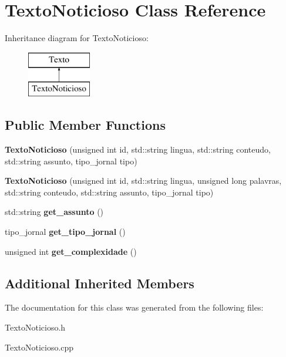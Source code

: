 \hypertarget{class_texto_noticioso}{\section{Texto\-Noticioso Class Reference}
\label{class_texto_noticioso}
}
Inheritance diagram for Texto\-Noticioso\-:\begin{figure}[H]
\begin{center}
\leavevmode
\includegraphics[height=2.000000cm]{class_texto_noticioso}
\end{center}
\end{figure}
\subsection*{Public Member Functions}
\begin{DoxyCompactItemize}
\item 
\hypertarget{class_texto_noticioso_a74a984b14609c5ad38a32cefcc5c9da7}{{\bfseries Texto\-Noticioso} (unsigned int id, std\-::string lingua, std\-::string conteudo, std\-::string assunto, tipo\-\_\-jornal tipo)}\label{class_texto_noticioso_a74a984b14609c5ad38a32cefcc5c9da7}

\item 
\hypertarget{class_texto_noticioso_a9b82b7cd28537c9aa6c214d3439ab6f5}{{\bfseries Texto\-Noticioso} (unsigned int id, std\-::string lingua, unsigned long palavras, std\-::string conteudo, std\-::string assunto, tipo\-\_\-jornal tipo)}\label{class_texto_noticioso_a9b82b7cd28537c9aa6c214d3439ab6f5}

\item 
\hypertarget{class_texto_noticioso_afd686397a10b9e6afa8eb9f1aaf5d21e}{std\-::string {\bfseries get\-\_\-assunto} ()}\label{class_texto_noticioso_afd686397a10b9e6afa8eb9f1aaf5d21e}

\item 
\hypertarget{class_texto_noticioso_ac0edd9121ef61cb4adc360faabecd62b}{tipo\-\_\-jornal {\bfseries get\-\_\-tipo\-\_\-jornal} ()}\label{class_texto_noticioso_ac0edd9121ef61cb4adc360faabecd62b}

\item 
\hypertarget{class_texto_noticioso_a5179276c932815f134aa1e70a6840d64}{unsigned int {\bfseries get\-\_\-complexidade} ()}\label{class_texto_noticioso_a5179276c932815f134aa1e70a6840d64}

\end{DoxyCompactItemize}
\subsection*{Additional Inherited Members}


The documentation for this class was generated from the following files\-:\begin{DoxyCompactItemize}
\item 
Texto\-Noticioso.\-h\item 
Texto\-Noticioso.\-cpp\end{DoxyCompactItemize}
